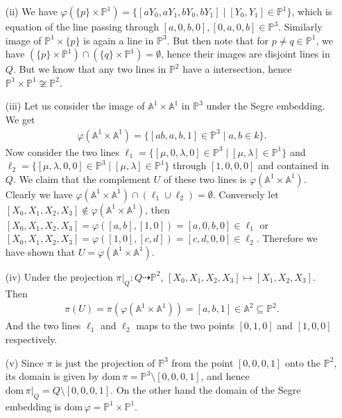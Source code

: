 \documentclass[12pt]{article}
\begin{document}
\begin{enumerate}
        \item[(ii)] We have $\varphi(\{p\} \times \mathbb{P}^1) = \{ [aY_0, aY_1, bY_0, bY_1] \mid [Y_0,Y_1] \in \mathbb{P}^1 \}$, which is equation of the line passing through $[a,0,b,0],[0,a,0,b] \in \mathbb{P}^3$. Similarly image of $\mathbb{P}^1 \times \{p\}$ is again a line in $\mathbb{P}^3$. But then note that for $p \neq q \in \mathbb{P}^1$, we have $(\{p\} \times \mathbb{P}^1) \cap (\{q\} \times \mathbb{P}^1) = \emptyset$, hence their images are disjoint lines in $Q$. But we know that any two lines in $\mathbb{P}^2$ have a intersection, hence $\mathbb{P}^1 \times \mathbb{P}^1 \not\cong \mathbb{P}^2$.
        
        \item[(iii)] Let us consider the image of $\mathbb{A}^1 \times \mathbb{A}^1$ in $\mathbb{P}^3$ under the Segre embedding. We get 
        \begin{align*}
            \varphi(\mathbb{A}^1 \times \mathbb{A}^1) = \{ [ab,a,b,1] \in \mathbb{P}^3 \mid a,b \in k \}.
        \end{align*}
        Now consider the two lines $\ell_1 = \{[\mu,0,\lambda,0] \in \mathbb{P}^3 \mid [\mu,\lambda] \in \mathbb{P}^1 \}$ and $\ell_2 = \{[\mu,\lambda,0,0] \in \mathbb{P}^3 \mid [\mu,\lambda] \in \mathbb{P}^1 \}$ through $[1,0,0,0]$ and contained in $Q$. We claim that the complement $U$ of these two lines is $\varphi(\mathbb{A}^1 \times \mathbb{A}^1)$. Clearly we have $\varphi(\mathbb{A}^1 \times \mathbb{A}^1) \cap (\ell_1 \cup \ell_2) = \emptyset$. Conversely let $[X_0,X_1,X_2,X_3] \notin \varphi(\mathbb{A}^1 \times \mathbb{A}^1)$, then $[X_0,X_1,X_2,X_3] = \varphi([a,b],[1,0]) = [a,0,b,0] \in \ell_1$ or $[X_0,X_1,X_2,X_3] = \varphi([1,0],[c,d]) = [c,d,0,0] \in \ell_2$. Therefore we have shown that $U = \varphi(\mathbb{A}^1 \times \mathbb{A}^1)$.
    
        \item[(iv)] Under the projection $\pi\vert_Q : Q \dashrightarrow \mathbb{P}^2$, $[X_0,X_1,X_2,X_3] \mapsto [X_1,X_2,X_3]$. Then 
        \begin{align*}
            \pi(U) = \pi(\varphi(\mathbb{A}^1 \times \mathbb{A}^1)) = [a,b,1] \in \mathbb{A}^2 \subseteq \mathbb{P}^2.
        \end{align*}
        And the two lines $\ell_1$ and $\ell_2$ maps to the two points $[0,1,0]$ and $[1,0,0]$ respectively. 
    
        \item[(v)] Since $\pi$ is just the projection of $\mathbb{P}^3$ from the point $[0,0,0,1]$ onto the $\mathbb{P}^2$, its domain is given by $\mathrm{dom}\, \pi = \mathbb{P}^3 \setminus [0,0,0,1]$, and hence $\mathrm{dom}\, \pi\vert_Q = Q \setminus [0,0,0,1]$. On the other hand the domain of the Segre embedding is $\mathrm{dom} \, \varphi = \mathbb{P}^1 \times \mathbb{P}^1$. 
    \end{enumerate}
\end{document}
